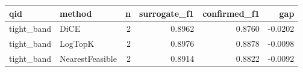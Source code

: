 \begin{tabular}{llrrrr}
\toprule
       qid &          method &  n &  surrogate\_f1 &  confirmed\_f1 &     gap \\
\midrule
tight\_band &            DiCE &  2 &        0.8962 &        0.8760 & -0.0202 \\
tight\_band &         LogTopK &  2 &        0.8976 &        0.8878 & -0.0098 \\
tight\_band & NearestFeasible &  2 &        0.8914 &        0.8822 & -0.0092 \\
\bottomrule
\end{tabular}

